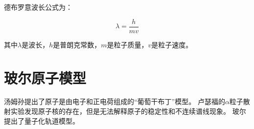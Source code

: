 \documentclass[12pt,a4paper]{article}
\begin{document}
德布罗意波长公式为：
\begin{tcolorbox}[colback=green!10, colframe=green!75!black, sharp corners]
    \begin{equation*}
        \lambda = \frac{h}{mv}
    \end{equation*}
\end{tcolorbox}
其中$\lambda$是波长，$h$是普朗克常数，$m$是粒子质量，$v$是粒子速度。

\section{玻尔原子模型}

\indent 汤姆孙提出了原子是由电子和正电荷组成的“葡萄干布丁”模型。
卢瑟福的$\alpha$粒子散射实验发现原子核的存在，但是无法解释原子的稳定性和不连续谱线现象。
玻尔提出了量子化轨道模型。
\end{document}
